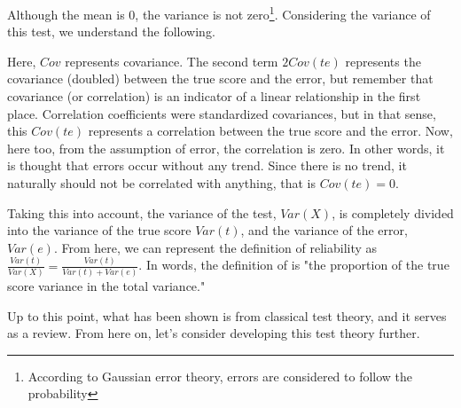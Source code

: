 \documentclass{ltjsbook}
\begin{document}
Although the mean is $0$, the variance is not zero\footnote{According to Gaussian error theory, errors are considered to follow the probability }. Considering the variance of this test, we understand the following.

Here, $Cov$ represents covariance. The second term $2Cov(te)$ represents the covariance (doubled) between the true score and the error, but remember that covariance (or correlation) is an indicator of a linear relationship in the first place. Correlation coefficients were standardized covariances, but in that sense, this $Cov(te)$ represents a correlation between the true score and the error. Now, here too, from the assumption of error, the correlation is zero. In other words, it is thought that errors occur without any trend. Since there is no trend, it naturally should not be correlated with anything, that is $Cov(te)=0$.

Taking this into account, the variance of the test, $Var(X)$, is completely divided into the variance of the true score $Var(t)$, and the variance of the error, $Var(e)$. From here, we can represent the definition of reliability as $\frac{Var(t)}{Var(X)}=\frac{Var(t)}{Var(t)+Var(e)}$.
In words, the definition of  is "the proportion of the true score variance in the total variance."

Up to this point, what has been shown is from classical test theory, and it serves as a review. From here on, let's consider developing this test theory further.
\end{document}
